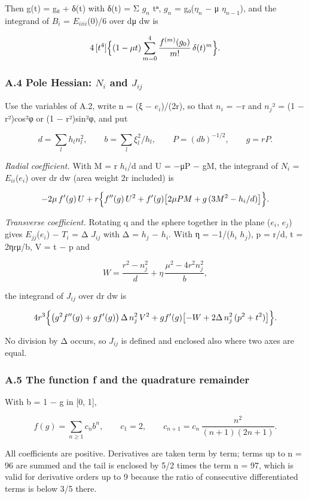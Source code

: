 \documentclass[
  11pt,
]{article}
\begin{document}
Then g(t) = g₀ + δ(t) with δ(t) = Σ \(g_{n}\) tⁿ, \(g_{n}\) =
g₀(\(\eta_{n}\) − μ \(\eta_{n-1}\)), and the integrand of \(B_{i}\) =
\(E_{iiii}\)(0)/6 over dμ dw is

\[
4\,[t^4]\Bigl\{(1-\mu t)\sum_{m=0}^{4}\frac{f^{(m)}(g_0)}{m!}\,\delta(t)^m\Bigr\}.
\]

\subsubsection{\texorpdfstring{A.4 Pole Hessian: \(N_{i}\) and
\(J_{ij}\)}{A.4 Pole Hessian: N\_\{i\} and J\_\{ij\}}}

Use the variables of A.2, write n = (ξ − \(e_{i}\))/(2r), so that
\(n_{i}\) = −r and \(n_{j}\)² = (1 − r²)cos²φ or (1 − r²)sin²φ, and put

\[
d=\sum_l h_l n_l^2,\qquad b=\sum_l \xi_l^2/h_l,\qquad P=(db)^{-1/2},\qquad g=rP .
\]

\emph{Radial coefficient.} With M = r \(h_{i}\)/d and U = −μP − gM, the
integrand of \(N_{i}\) = \(E_{ii}\)(\(e_{i}\)) over dr dw (area weight
2r included) is

\[
-2\mu\,f'(g)\,U+r\Bigl\{f''(g)\,U^2+f'(g)\bigl[2\mu PM+g\,(3M^2-h_i/d)\bigr]\Bigr\}.
\]

\emph{Transverse coefficient.} Rotating q and the sphere together in the
plane (\(e_{i}\), \(e_{j}\)) gives \(E_{jj}\)(\(e_{i}\)) − \(T_{i}\) = Δ
\(J_{ij}\) with Δ = \(h_{j}\) − \(h_{i}\). With η = −1/(\(h_{i}\)
\(h_{j}\)), p = r/d, t = 2ηrμ/b, V = t − p and

\[
W=\frac{r^2-n_j^2}{d}+\eta\,\frac{\mu^2-4r^2n_j^2}{b},
\]

the integrand of \(J_{ij}\) over dr dw is

\[
4r^3\Bigl\{\bigl(g^2f''(g)+g f'(g)\bigr)\,\Delta\,n_j^2\,V^2+g f'(g)\bigl[-W+2\Delta\,n_j^2\,(p^2+t^2)\bigr]\Bigr\}.
\]

No division by Δ occurs, so \(J_{ij}\) is defined and enclosed also
where two axes are equal.

\subsubsection{A.5 The function f and the quadrature remainder}

With b = 1 − g in {[}0, 1{]},

\[
f(g)=\sum_{n\ge1}c_n b^n,\qquad c_1=2,\qquad c_{n+1}=c_n\,\frac{n^2}{(n+1)(2n+1)} .
\]

All coefficients are positive. Derivatives are taken term by term; terms
up to n = 96 are summed and the tail is enclosed by 5/2 times the term n
= 97, which is valid for derivative orders up to 9 because the ratio of
consecutive differentiated terms is below 3/5 there.
\end{document}
